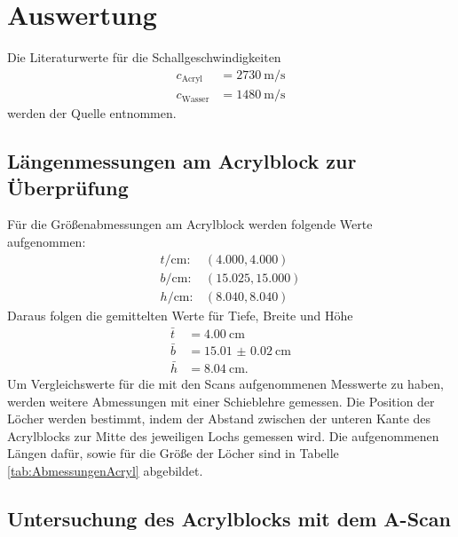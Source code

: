 \section{Auswertung}
\label{sec:Auswertung}

Die Literaturwerte für die Schallgeschwindigkeiten
\begin{align}
  c_\text{Acryl} & = \SI{2730}{\meter\per\second} \\
  c_\text{Wasser} & = \SI{1480}{\meter\per\second}
\end{align}
werden der Quelle \cite{schall} entnommen.

\subsection{Längenmessungen am Acrylblock zur Überprüfung}

Für die Größenabmessungen am Acrylblock werden folgende Werte aufgenommen:
\begin{align}
  t/\si{\centi\meter}: & (4.000 , 4.000) \\
  b/\si{\centi\meter}: & (15.025 , 15.000) \\
  h/\si{\centi\meter}: & (8.040, 8.040)
\end{align}
Daraus folgen die gemittelten Werte für Tiefe, Breite und Höhe
\begin{align}
  \bar{t} & = \SI{4.00}{\centi\meter} \\
  \bar{b} & = \SI{15.01(2)}{\centi\meter} \\
  \bar{h} & = \SI{8.04}{\centi\meter}.
  \label{eqn:AbmessungenAcryl}
\end{align}
Um Vergleichswerte für die mit den Scans aufgenommenen Messwerte zu haben,
werden weitere Abmessungen mit einer Schieblehre gemessen.
Die Position der Löcher werden bestimmt, indem der Abstand zwischen der
unteren Kante des Acrylblocks zur Mitte des jeweiligen Lochs gemessen wird.
Die aufgenommenen Längen dafür, sowie für die Größe der Löcher sind in
Tabelle \ref{tab:AbmessungenAcryl} abgebildet.

\subsection{Untersuchung des Acrylblocks mit dem A-Scan}

